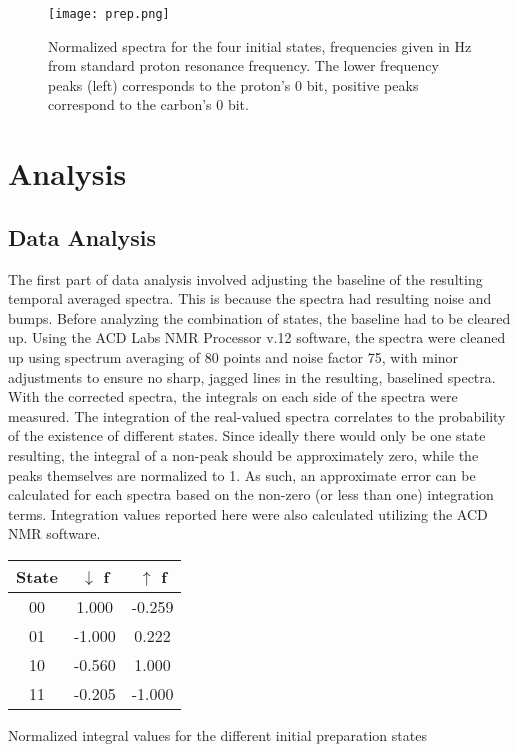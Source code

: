 \documentclass[11pt]{article}
\begin{document}
\begin{multicols}{2}
\begin{figure*}
  \begin{center}
    \texttt{[image: prep.png]}
  \end{center}
  \caption{Normalized spectra for the four initial states, frequencies given in Hz from standard proton resonance frequency. The lower frequency peaks (left) corresponds to the proton's 0 bit, positive peaks correspond to the carbon's 0 bit.}
  \label{fig:prep}
\end{figure*}



\section{\textbf{Analysis}}
  \subsection{Data Analysis}
  The first part of data analysis involved adjusting the baseline of the resulting temporal averaged spectra. This is because the spectra had resulting noise and bumps. Before analyzing the combination of states, the baseline had to be cleared up. Using the ACD Labs NMR Processor v.12 software, the spectra were cleaned up using spectrum averaging of 80 points and noise factor 75, with minor adjustments to ensure no sharp, jagged lines in the resulting, baselined spectra. \\

With the corrected spectra, the integrals on each side of the spectra were measured. The integration of the real-valued spectra correlates to the probability of the existence of different states. Since ideally there would only be one state resulting, the integral of a non-peak should be approximately zero, while the peaks themselves are normalized to 1. As such, an approximate error can be calculated for each spectra based on the non-zero (or less than one) integration terms. Integration values reported here were also calculated utilizing the ACD NMR software.

\begin{ctable}
  \begin{center}
  \begin{tabular}{c||c|c}
    State & $\downarrow$ f & $\uparrow$ f \\
    \hline
    00 & 1.000 & -0.259 \\
    01 & -1.000 & 0.222 \\
    10 & -0.560 & 1.000 \\
    11 & -0.205 & -1.000 \\
  \end{tabular}
  \end{center}
  \caption{Normalized integral values for the different initial preparation states}
  \label{tab:prep-int}
\end{ctable}


\end{multicols}
\end{document}
